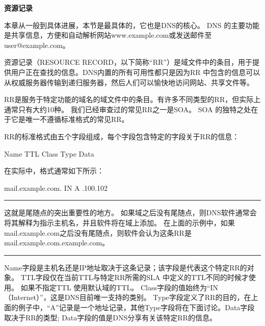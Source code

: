 ﻿\documentclass[english,runningheads,a4paper]{llncs}[2018/03/10]
\begin{document}
\par\noindent\textbf{资源记录}

\par\noindent 本章从一般到具体进展，本节是最具体的，它也是DNS的核心。 DNS 的主要功能是共享信息，方便和自动解析网站www.example.com或发送邮件至user@example.com。

\par\setlength\parindent{2em}资源记录（RESOURCE RECORD，以下简称“RR”）是域文件中的条目，用于提供用户正在查找的信息。DNS内置的所有可用性都只是因为RR 中包含的信息可以从权威服务器传输到递归服务器，然后人们可以愉快地访问网站、共享文件等。

\par\setlength\parindent{2em}RR是服务于特定功能的域名的域文件中的条目。有许多不同类型的RR，但实际上通常只有大约10种。 我们已经审查过的常见RR之一是SOA。 SOA 的独特之处在于它是唯一不遵循标准格式的常见RR。

\par\setlength\parindent{2em}RR的标准格式由五个字段组成，每个字段包含特定的字段关于RR的信息：

\par\setlength\parindent{2em}Name \qquad TTL \qquad Class \qquad Type \qquad Data

\par\setlength\parindent{2em} 在实际中，格式通常如下所示：

\par\setlength\parindent{2em} mail.example.com.  \qquad IN \qquad A .100.102

\par\noindent\rule[0.25\baselineskip]{\textwidth}{1pt} %

\begin{adjustwidth}{2em}{2em}
\qquad 这就是尾随点的突出重要性的地方。 如果域之后没有尾随点，则DNS软件通常会将其解释为指示主机名，并且软件将在域上添加。 在上面的示例中，如果mail.example.com之后没有尾随点，则软件会认为这条RR是mail.example.com.example.com。
\end{adjustwidth}

\par\noindent\rule[0.25\baselineskip]{\textwidth}{1pt} %

\par\setlength\parindent{2em} Name字段是主机名还是IP地址取决于这条记录；该字段是代表这个特定RR的对象。 TTL字段仅在当前TTL与特定RR所需的SLA 中定义的TTL不同的时候才使用。 如果不指定TTL 使用默认域的TTL。 Class字段的值始终为“IN（Internet）”，这是DNS目前唯一支持的类别。 Type字段定义了RR的目的，在上面的例子中，“A”记录是一个地址记录，其他Type字段将在下面讨论。Data字段取决于RR的类型; Data字段的值是DNS分享有关该特定RR的信息。
\end{document}
